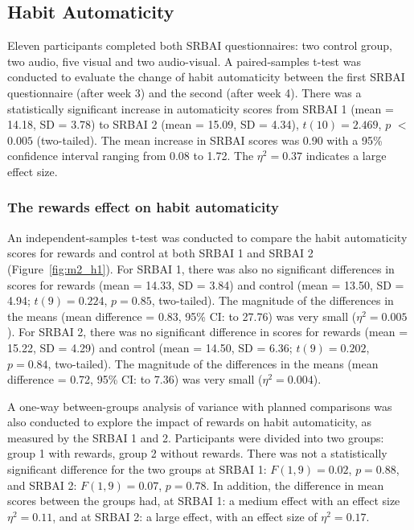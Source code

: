 \documentclass{scaffold/sigchi}
\begin{document}
\subsection{Habit Automaticity}
Eleven participants completed both SRBAI questionnaires: two control group, two audio, five visual and two audio-visual. A paired-samples t-test was conducted to evaluate the change of habit automaticity between the first SRBAI questionnaire (after week 3) and the second (after week 4). There was a statistically significant increase in automaticity scores from SRBAI 1 (mean = 14.18, SD = 3.78) to SRBAI 2 (mean = 15.09, SD = 4.34), $t(10) = 2.469$, $p$ $<$ $0.005$ (two-tailed). The mean increase in SRBAI scores was 0.90 with a 95\% confidence interval ranging from 0.08 to 1.72. The $\eta^{2} = 0.37$ indicates a large effect size.


\subsubsection{The rewards effect on habit automaticity}
An independent-samples t-test was conducted to compare the habit automaticity scores
for rewards and control at both SRBAI 1 and SRBAI 2 (Figure~\ref{fig:m2_h1}). For SRBAI 1, there was also no significant differences in scores for rewards (mean = 14.33, SD = 3.84) and control (mean = 13.50, SD = 4.94; $t(9) = 0.224$, $p = 0.85$,
two-tailed). The magnitude of the differences in the means (mean difference = 0.83,
95\% CI:  to 27.76) was very small ($\eta^{2} = 0.005$). For SRBAI 2, there was no significant difference in scores for rewards
(mean = 15.22, SD = 4.29) and control (mean = 14.50, SD = 6.36; $t(9) = 0.202$, $p = 0.84$,
two-tailed). The magnitude of the differences in the means (mean difference = 0.72,
95\% CI:  to 7.36) was very small ($\eta^{2} = 0.004$).


A one-way between-groups analysis of variance with planned comparisons was also conducted to explore the impact of rewards on habit automaticity, as measured by the SRBAI 1 and 2. Participants were divided into two groups: group 1 with rewards, group 2 without rewards. There was not a
statistically significant difference for the two groups at SRBAI 1: $F(1,9) = 0.02$, $p = 0.88$, and SRBAI 2: $F(1,9) = 0.07$, $p = 0.78$. In addition, the difference in mean scores between the groups had, at SRBAI 1: a medium effect with an effect size $\eta^{2} = 0.11$, and at SRBAI 2: a large effect, with an effect size of $\eta^{2} = 0.17$.
\end{document}
